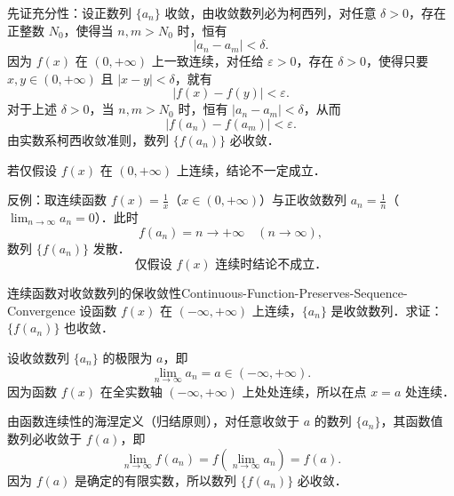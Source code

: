 \begin{solution}
    先证充分性：设正数列 $\{a_n\}$ 收敛，由收敛数列必为柯西列，对任意 $\delta > 0$，存在正整数 $N_0$，使得当 $n, m > N_0$ 时，恒有
    \begin{equation}
        |a_n - a_m| < \delta.
    \end{equation}
    因为 $f(x)$ 在 $(0, +\infty)$ 上一致连续，对任给 $\varepsilon > 0$，存在 $\delta > 0$，使得只要 $x, y \in (0, +\infty)$ 且 $|x - y| < \delta$，就有
    \begin{equation}
        |f(x) - f(y)| < \varepsilon.
    \end{equation}
    对于上述 $\delta > 0$，当 $n, m > N_0$ 时，恒有 $|a_n - a_m| < \delta$，从而
    \begin{equation}
        |f(a_n) - f(a_m)| < \varepsilon.
    \end{equation}
    由实数系柯西收敛准则，数列 $\{f(a_n)\}$ 必收敛．

    若仅假设 $f(x)$ 在 $(0, +\infty)$ 上连续，结论不一定成立．

    反例：取连续函数 $f(x) = \frac{1}{x}$（$x \in (0, +\infty)$）与正收敛数列 $a_n = \frac{1}{n}$（$\lim_{n\to\infty} a_n = 0$）．此时
    \begin{equation}
        f(a_n) = n \to +\infty \quad (n \to \infty),
    \end{equation}
    数列 $\{f(a_n)\}$ 发散．
    \begin{equation}
        \boxed{\text{仅假设 } f(x) \text{ 连续时结论不成立．}}
    \end{equation}
\end{solution}

\begin{problem}{连续函数对收敛数列的保收敛性}{Continuous-Function-Preserves-Sequence-Convergence}
    设函数 $f(x)$ 在 $(-\infty, +\infty)$ 上连续，$\{a_n\}$ 是收敛数列．求证：$\{f(a_n)\}$ 也收敛．
\end{problem}

\begin{myproof}
    设收敛数列 $\{a_n\}$ 的极限为 $a$，即
    \begin{equation}
        \lim_{n\to\infty} a_n = a \in (-\infty, +\infty).
    \end{equation}
    因为函数 $f(x)$ 在全实数轴 $(-\infty, +\infty)$ 上处处连续，所以在点 $x = a$ 处连续．

    由函数连续性的海涅定义（归结原则），对任意收敛于 $a$ 的数列 $\{a_n\}$，其函数值数列必收敛于 $f(a)$，即
    \begin{equation}
        \lim_{n\to\infty} f(a_n) = f\left( \lim_{n\to\infty} a_n \right) = f(a).
    \end{equation}
    因为 $f(a)$ 是确定的有限实数，所以数列 $\{f(a_n)\}$ 必收敛．
\end{myproof}

